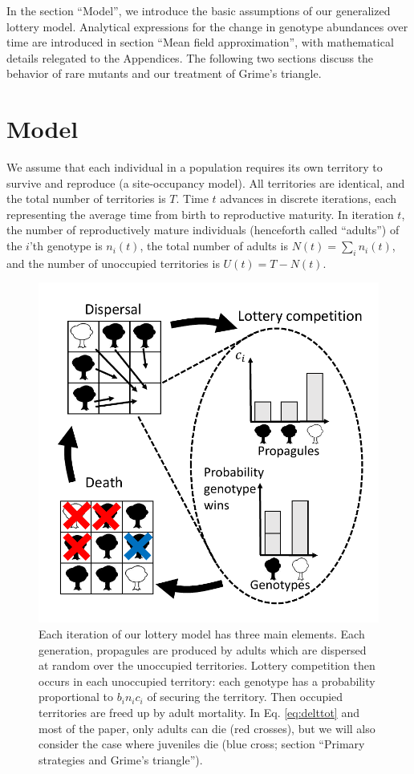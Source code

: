 \documentclass[11pt]{article}
\begin{document}
In the section ``Model'', we introduce the basic assumptions of our generalized lottery model. Analytical expressions for the change in genotype abundances over time are introduced in section ``Mean field approximation'', with mathematical details relegated to the Appendices. The following two sections discuss the behavior of rare mutants and our treatment of Grime's triangle. 
 
\section*{Model}\label{sec:model}

We assume that each individual in a population requires its own territory to survive and reproduce (a site-occupancy model). All territories are identical, and the total number of territories is $T$. Time $t$ advances in discrete iterations, each representing the average time from birth to reproductive maturity. In iteration $t$, the number of reproductively mature individuals (henceforth called ``adults'') of the $i$'th genotype is $n_i(t)$, the total number of adults is $N(t)=\sum_i n_i(t)$, and the number of unoccupied territories is $U(t)=T-N(t)$. 

\begin{figure}
\centering
\includegraphics[scale=0.8]{lottery.pdf}
\caption{\label{fig:lottery} Each iteration of our lottery model has three main elements. Each generation, propagules are produced by adults which are dispersed at random over the unoccupied territories. Lottery competition then occurs in each unoccupied territory: each genotype has a probability proportional to $b_i n_i c_i$ of securing the territory. Then occupied territories are freed up by adult mortality. In Eq. \eqref{eq:delttot} and most of the paper, only adults can die (red crosses), but we will also consider the case where juveniles die (blue cross; section ``Primary strategies and Grime's triangle'').} 
\end{figure}
\end{document}
